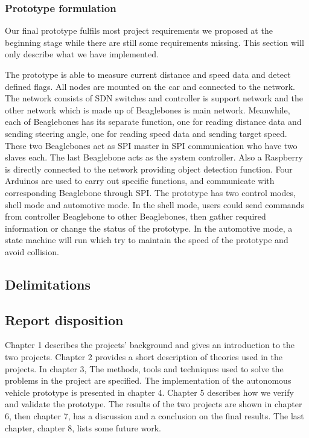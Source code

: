 \documentclass[11pt, titlepage]{article} %
\begin{document}
\subsubsection{Prototype formulation}
Our final prototype fulfils most project requirements we proposed at the beginning stage while there are still some requirements missing. This section will only describe what we have implemented.

The prototype is able to measure current distance and speed data and detect defined flags. All nodes are mounted on the car and connected to the network. The network consists of SDN switches and controller is support network and the other network which is made up of Beaglebones is main network. Meanwhile, each of Beaglebones has its separate function, one for reading distance data and sending steering angle, one for reading speed data and sending target speed. These two Beaglebones act as SPI master in SPI communication who have two slaves each. The last Beaglebone acts as the system controller. Also a Raspberry is directly connected to the network providing object detection function. Four Arduinos are used to carry out specific functions, and communicate with corresponding Beaglebone through SPI.
The prototype has two control modes, shell mode and automotive mode. In the shell mode, users could send commands from controller Beaglebone to other Beaglebones, then gather required information or change the status of the prototype. In the automotive mode, a state machine will run which try to maintain the speed of the prototype and avoid collision. 


\subsection{Delimitations}

\subsection{Report disposition}
Chapter 1 describes the projects' background and gives an introduction to the two projects. Chapter 2 provides a short description of theories used in the projects. In chapter 3, The methods, tools and techniques used to solve the problems in the project are specified. The implementation of the autonomous vehicle prototype is presented in chapter 4. Chapter 5 describes how we verify and validate the prototype. The results of the two projects are shown in chapter 6, then chapter 7, has a discussion and a conclusion on the final results. The last chapter, chapter 8, lists some future work.  
\clearpage
\end{document}
